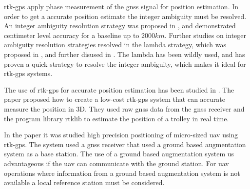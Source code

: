 \acrfull{rtk-gps} apply phase measurement of the \gls{gnss} signal for position estimation. In order to get a accurate position estimate the integer ambiguity must be resolved. An integer ambiguity resolution strategy was proposed in \citep{GeodeticBaselines}, and demonstrated centimeter level accuracy for a baseline up to $2000km$. Further studies on integer ambiguity resolution strategies resolved in the \acrfull{lambda} strategy, which was proposed in \citep{Ambiguity:Estimation}, and further disused in \citep{LAMBDA:METHOD,LAMBDAMETHOD}. The \gls{lambda} has been wildly used, and has proven a quick strategy to resolve the integer ambiguity, which makes it ideal for \gls{rtk-gps} systems. 

The use of \gls{rtk-gps} for accurate position estimation has been studied in \citep{3D-RTK}. The paper proposed how to create a low-cost \gls{rtk-gps} system that can accurate measure the position in 3D. They used raw \gls{gnss} data from the \gls{gnss} receiver and the program library \acrfull{rtklib} to estimate the position of a trolley in real time.

In the paper \citep{Low-costRTK} it was studied high precision positioning of micro-sized \gls{uav} using \gls{rtk-gps}. The system used a \gls{gnss} receiver that used a ground based augmentation system as a base station. The use of a ground based augmentation system us advantageous if the \gls{uav} can communicate with the ground station. For \gls{uav} operations where information from a ground based augmentation system is not available a local reference station must be considered.



